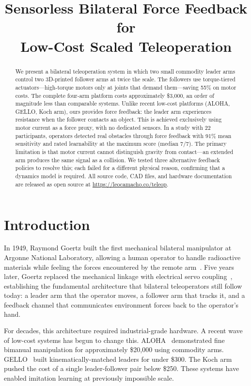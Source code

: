 \documentclass[conference]{IEEEtran}
\title{Sensorless Bilateral Force Feedback for\\Low-Cost Scaled Teleoperation}
\author{\IEEEauthorblockN{Leonardo Camacho Pel\'{a}ez}
\IEEEauthorblockA{University of Edinburgh\\
\texttt{leocamacho707@gmail.com}}}
\begin{document}
\maketitle
\setcounter{figure}{0}
\label{fig:hero}

\begin{abstract}
We present a bilateral teleoperation system in which two small commodity leader arms control two 3D-printed follower arms at twice the scale.
The followers use torque-tiered actuators---high-torque motors only at joints that demand them---saving 55\% on motor costs.
The complete four-arm platform costs approximately \$3{,}000, an order of magnitude less than comparable systems.
Unlike recent low-cost platforms (ALOHA, GELLO, Koch arm), ours provides force feedback: the leader arm experiences resistance when the follower contacts an object.
This is achieved exclusively using motor current as a force proxy, with no dedicated sensors.
In a study with 22 participants, operators detected real obstacles through force feedback with 91\% mean sensitivity and rated learnability at the maximum score (median 7/7).
The primary limitation is that motor current cannot distinguish gravity from contact---an extended arm produces the same signal as a collision.
We tested three alternative feedback policies to resolve this; each failed for a different physical reason, confirming that a dynamics model is required.
All source code, CAD files, and hardware documentation are released as open source at \url{https://leocamacho.co/teleop}.
\end{abstract}

\section{Introduction}

In 1949, Raymond Goertz built the first mechanical bilateral manipulator at Argonne National Laboratory, allowing a human operator to handle radioactive materials while feeling the forces encountered by the remote arm~\cite{goertz1949}. Five years later, Goertz replaced the mechanical linkage with electrical servo coupling~\cite{goertz1954}, establishing the fundamental architecture that bilateral teleoperators still follow today: a leader arm that the operator moves, a follower arm that tracks it, and a feedback channel that communicates environment forces back to the operator's hand.

For decades, this architecture required industrial-grade hardware. A recent wave of low-cost systems has begun to change this. ALOHA~\cite{zhao2023aloha} demonstrated fine bimanual manipulation for approximately \$20,000 using commodity arms. GELLO~\cite{wu_2024_gello} built kinematically-matched leaders for under \$300. The Koch arm~\cite{koch2024} pushed the cost of a single leader-follower pair below \$250. These systems have enabled imitation learning at previously impossible scale.
\end{document}
